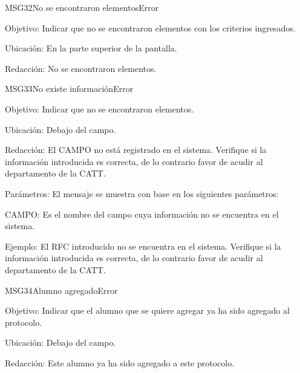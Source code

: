 \begin{mensaje}{MSG32}{No se encontraron elementos}{Error}
	\item[Objetivo:] Indicar que no se encontraron elementos con los criterios ingresados.
    \item[Ubicación:] En la parte superior de la pantalla.
    \item[Redacción:] No se encontraron elementos.
\end{mensaje}
 
\begin{mensaje}{MSG33}{No existe información}{Error}
	\item[Objetivo:] Indicar que no se encontraron elementos.
	\item[Ubicación:] Debajo del campo.
	\item[Redacción:] El CAMPO no está registrado en el sistema. Verifique si la información introducida es correcta, de lo contrario favor de acudir al departamento de la CATT.
	\item[Parámetros:] El mensaje se muestra con base en los siguientes parámetros:
	\begin{Citemize}
		\item CAMPO: Es el nombre del campo cuya información no se encuentra en el sistema.
	\end{Citemize}
	\item[Ejemplo:] El RFC introducido no se encuentra en el sistema. Verifique si la información introducida es correcta, de lo contrario favor de acudir al departamento de la CATT.
\end{mensaje}



\begin{mensaje}{MSG34}{Alumno agregado}{Error}
	\item[Objetivo:] Indicar que el alumno que se quiere agregar ya ha sido agregado al protocolo.
	\item[Ubicación:] Debajo del campo.
	\item[Redacción:] Este alumno ya ha sido agregado a este protocolo.
\end{mensaje}

